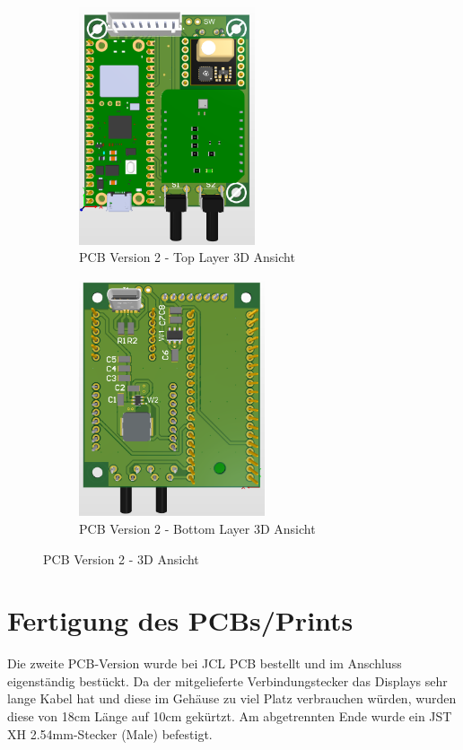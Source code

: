 \begin{inhalt}
   \begin{figure}[H] 
  \centering
  \begin{subfigure}[b]{0.48\textwidth}
    \centering
    \includegraphics[height=7cm]{files/Tobias/pics/Schaltungen/3D/Top_Layer_3D.PNG}
    \caption{PCB Version 2 - Top Layer 3D Ansicht}
    \label{fig:PCB_Version2_Top_3D}
  \end{subfigure}
  \hfill
  \begin{subfigure}[b]{0.48\textwidth}
    \centering
    \includegraphics[height=7cm]{files/Tobias/pics/Schaltungen/3D/Bottom_Layer_3D.PNG}
    \caption{PCB Version 2 - Bottom Layer 3D Ansicht}
    \label{fig:PCB_Version2_Bot_3D}
  \end{subfigure}
  \caption{PCB Version 2 - 3D Ansicht}
  \label{fig:PCB_Version_2_3D}
\end{figure}



\section{Fertigung des PCBs/Prints}

Die zweite PCB-Version wurde bei JCL PCB bestellt und im Anschluss eigenständig bestückt. Da der mitgelieferte Verbindungstecker das Displays sehr lange Kabel hat und diese im Gehäuse zu viel Platz verbrauchen würden, wurden diese von 18cm Länge auf 10cm gekürtzt. Am abgetrennten Ende wurde ein JST XH 2.54mm-Stecker (Male) befestigt.




\end{inhalt}
